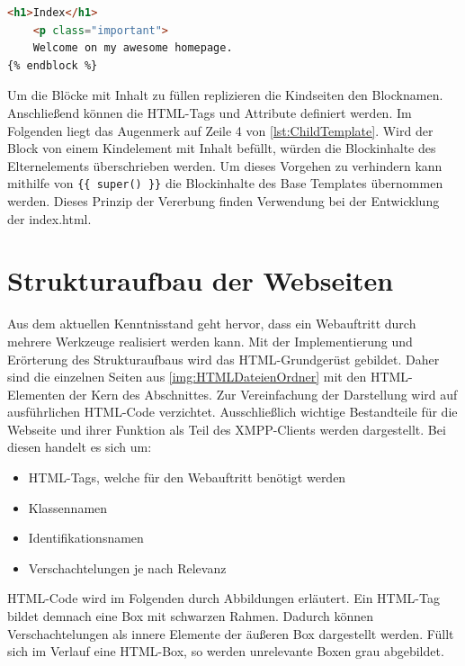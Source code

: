 \documentclass[a4paper,titlepage,halfparskip,12pt]{scrreprt}
\begin{document}
\begin{onehalfspacing}
\begin{lstlisting}[language=HTML,caption=Beispiel einer Grundseite für das Vererbungsprinzip,label={lst:ChildTemplate}]
	<h1>Index</h1>
	<p class="important">
	Welcome on my awesome homepage.
{% endblock %}
\end{lstlisting}
Um die Blöcke mit Inhalt zu füllen replizieren die Kindseiten den Blocknamen. Anschließend können die HTML-Tags und Attribute definiert werden. Im Folgenden liegt das Augenmerk auf Zeile 4 von \autoref{lst:ChildTemplate}. Wird der Block von einem Kindelement mit Inhalt befüllt, würden die Blockinhalte des Elternelements überschrieben werden. Um dieses Vorgehen zu verhindern kann mithilfe von \texttt{\{\{ super() \}\}} die Blockinhalte des Base Templates übernommen werden. Dieses Prinzip der Vererbung finden Verwendung bei der Entwicklung der index.html. \cite{FlaskTempInherDoc}

\section{Strukturaufbau der Webseiten}
\label{subsec:StrukturaufbauWebseiten}
Aus dem aktuellen Kenntnisstand geht hervor, dass ein Webauftritt durch mehrere Werkzeuge realisiert werden kann. Mit der Implementierung und Erörterung des Strukturaufbaus wird das HTML-Grundgerüst gebildet. Daher sind die einzelnen Seiten aus \autoref{img:HTMLDateienOrdner} mit den HTML-Elementen der Kern des Abschnittes. Zur Vereinfachung der Darstellung wird auf ausführlichen HTML-Code verzichtet. Ausschließlich wichtige Bestandteile für die Webseite und ihrer Funktion als Teil des XMPP-Clients werden dargestellt. Bei diesen handelt es sich um:
\begin{itemize}
	\item HTML-Tags, welche für den Webauftritt benötigt werden
	\item Klassennamen
	\item Identifikationsnamen
	\item Verschachtelungen je nach Relevanz
\end{itemize}
HTML-Code wird im Folgenden durch Abbildungen erläutert. Ein HTML-Tag bildet demnach eine Box mit schwarzen Rahmen. Dadurch können Verschachtelungen als innere Elemente der äußeren Box dargestellt werden. Füllt sich im Verlauf eine HTML-Box, so werden unrelevante Boxen grau abgebildet.


\end{onehalfspacing}
\end{document}
